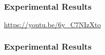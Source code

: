 \begin{frame}
    \frametitle{Experimental Results}
    \centering
    \LARGE
    \textcolor{hicolour}{\url{https://youtu.be/6y\_C7NIzXto}}
\end{frame}

\begin{frame}
    \frametitle{Experimental Results}
    \begin{figure}[h]
        \centering
        \resizebox{0.9\textwidth}{!}{}
    \end{figure}
\end{frame}
